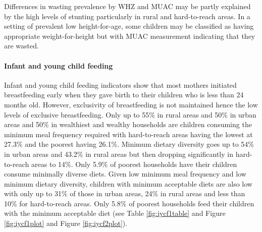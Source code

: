\documentclass[12pt,a4paper]{article}
\let\oldparagraph\paragraph
\renewcommand{\paragraph}[1]{\oldparagraph{#1}\mbox{}}
\begin{document}
Differences in wasting prevalence by WHZ and MUAC may be partly explained by the high levels of stunting particularly in rural and hard-to-reach areas. In a setting of prevalent low height-for-age, some children may be classified as having appropriate weight-for-height but with MUAC measurement indicating that they are wasted.

\hypertarget{iycf-results}{%
\paragraph{Infant and young child feeding}\label{iycf-results}}

Infant and young child feeding indicators show that most mothers initiated breastfeeding early when they gave birth to their children who is less than 24 months old. However, exclusivity of breastfeeding is not maintained hence the low levels of exclusive breastfeeding. Only up to 55\% in rural areas and 50\% in urban areas and 50\% in wealthiest and wealthy households are children consuming the minimum meal frequency required with hard-to-reach areas having the lowest at 27.3\% and the poorest having 26.1\%. Minimum dietary diversity goes up to 54\% in urban areas and 43.2\% in rural areas but then dropping significantly in hard-to-reach areas to 14\%. Only 5.9\% of poorest households have their children consume minimally diverse diets. Given low minimum meal frequency and low minimum dietary diversity, children with minimum acceptable diets are also low with only up to 31\% of those in urban areas, 24\% in rural areas and less than 10\% for hard-to-reach areas. Only 5.8\% of poorest households feed their children with the minimum acceptable diet (see Table \ref{fig:iycf1table} and Figure \ref{fig:iycf1plot} and Figure \ref{fig:iycf2plot}).
\end{document}
